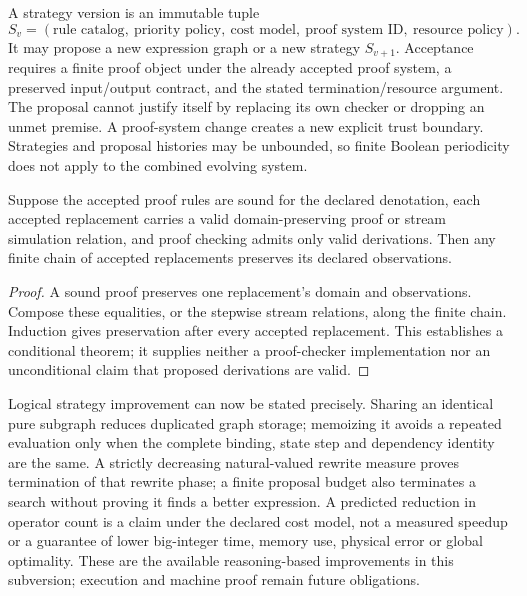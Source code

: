 A strategy version is an immutable tuple
\[
 S_v=(\text{rule catalog},\ \text{priority policy},\ \text{cost model},
       \ \text{proof system ID},\ \text{resource policy}).
\]
It may propose a new expression graph or a new strategy $S_{v+1}$. Acceptance
requires a finite proof object under the already accepted proof system, a
preserved input/output contract, and the stated termination/resource argument.
The proposal cannot justify itself by replacing its own checker or dropping an
unmet premise. A proof-system change creates a new explicit trust boundary.
Strategies and proposal histories may be unbounded, so finite Boolean
periodicity does not apply to the combined evolving system.

\begin{proposition}
Suppose the accepted proof rules are sound for the declared denotation, each
accepted replacement carries a valid domain-preserving proof or stream
simulation relation, and proof checking admits only valid derivations. Then any
finite chain of accepted replacements preserves its declared observations.
\end{proposition}
\begin{proof}
A sound proof preserves one replacement's domain and observations. Compose
these equalities, or the stepwise stream relations, along the finite chain.
Induction gives preservation after every accepted replacement. This establishes
a conditional theorem; it supplies neither a proof-checker implementation nor
an unconditional claim that proposed derivations are valid.
\end{proof}

Logical strategy improvement can now be stated precisely. Sharing an identical
pure subgraph reduces duplicated graph storage; memoizing it avoids a repeated
evaluation only when the complete binding, state step and dependency identity
are the same. A strictly decreasing natural-valued rewrite measure proves
termination of that rewrite phase; a finite proposal budget also terminates a
search without proving it finds a better expression. A predicted reduction in
operator count is a claim under the declared cost model, not a measured speedup
or a guarantee of lower big-integer time, memory use, physical error or global
optimality. These are the available reasoning-based improvements in this
subversion; execution and machine proof remain future obligations.
